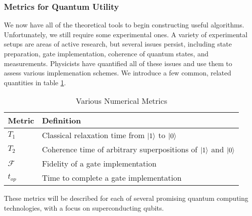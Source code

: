 \documentclass{article}
\begin{document}
\subsubsection{Metrics for Quantum Utility}
\begin{paragraph}{}
We now have all of the theoretical tools to begin constructing useful algorithms.  Unfortunately, we still require some experimental ones.  A variety of experimental setups are areas of active research, but several issues persist, including state preparation, gate implementation, coherence of quantum states, and measurements. \cite{nielsen}  Physicists have quantified all of these issues and use them to assess various implemenation schemes.  We introduce a few common, related quantities in table \ref{nums}. \cite{nielsen}

\begin{table}[h]
\centering
\caption{Various Numerical Metrics}\vspace{6mm}
\begin{tabular}{m{1cm}|m{9cm}}\label{nums}
Metric & Definition \\
\hline
$T_1$ &Classical relaxation time from $\ket{1}$ to $\ket{0}$\\
$T_2$ &Coherence time of arbitrary superpositions of $\ket{1}$ and $\ket{0}$\\
$\mathcal{F}$ &Fidelity of a gate implementation\\
$t_{op}$ &Time to complete a gate implementation\\
\end{tabular}
\end{table}
\noindent These metrics will be described for each of several promising quantum computing technologies, with a focus on superconducting qubits.

\end{paragraph}
\end{document}

